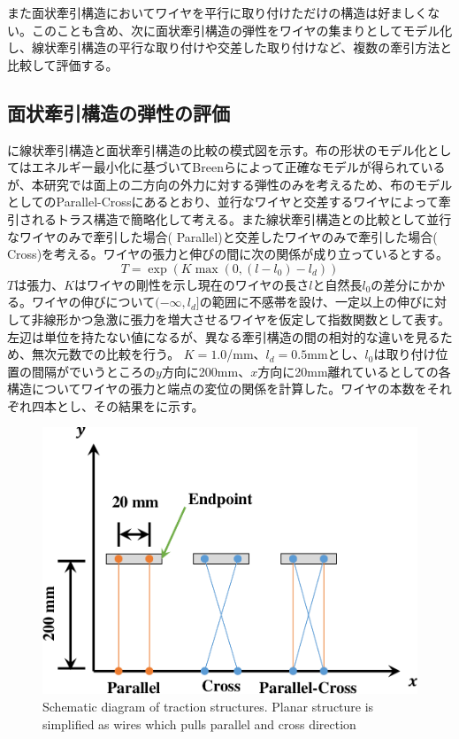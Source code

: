 \documentclass{jarticle}
\begin{document}
また面状牽引構造においてワイヤを平行に取り付けただけの構造は好ましくない。このことも含め、次に面状牽引構造の弾性をワイヤの集まりとしてモデル化し、線状牽引構造の平行な取り付けや交差した取り付けなど、複数の牽引方法と比較して評価する。

\subsection{面状牽引構造の弾性の評価}\label{sec:hoge}
に線状牽引構造と面状牽引構造の比較の模式図を示す。布の形状のモデル化としてはエネルギー最小化に基づいてBreen\cite{Breen:1994}らによって正確なモデルが得られているが、本研究では面上の二方向の外力に対する弾性のみを考えるため、布のモデルとしてのParallel-Crossにあるとおり、並行なワイヤと交差するワイヤによって牽引されるトラス構造で簡略化して考える。また線状牽引構造との比較として並行なワイヤのみで牽引した場合( Parallel)と交差したワイヤのみで牽引した場合( Cross)を考える。ワイヤの張力と伸びの間に次の関係が成り立っているとする。
\begin{equation}
  T = \exp(K\max(0,(l-l_0) - l_d))
\end{equation}
${T}$は張力、${K}$はワイヤの剛性を示し現在のワイヤの長さ${l}$と自然長${l_0}$の差分にかかる。ワイヤの伸びについて$(-\infty,l_d]$の範囲に不感帯を設け、一定以上の伸びに対して非線形かつ急激に張力を増大させるワイヤを仮定して指数関数として表す。左辺は単位を持たない値になるが、異なる牽引構造の間の相対的な違いを見るため、無次元数での比較を行う。
${K=1.0}$/mm、${l_d=0.5}$mmとし、${l_0}$は取り付け位置の間隔がでいうところの${y}$方向に200mm、${x}$方向に20mm離れているとしての各構造についてワイヤの張力と端点の変位の関係を計算した。ワイヤの本数をそれぞれ四本とし、その結果をに示す。

\begin{figure}[tb]
 \centering
  \includegraphics[width=0.8\columnwidth]{figs/schematic-comparison-of-ligaments.pdf}
  \vspace*{-4mm}
  \caption{Schematic diagram of traction structures. Planar structure is simplified as wires which pulls parallel and cross direction}
  \label{fig:comparison}
\end{figure}
\end{document}

